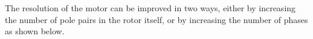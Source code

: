 \begin{figure}[htp] 
    \centering
    \hfill%
\end{figure}

The resolution of the motor can be improved in two ways, either by increasing the number of pole pairs in the rotor itself, or by increasing the number of phases as shown below.


\begin{figure}[htp] 
    \centering
    \hfill%
\end{figure}

